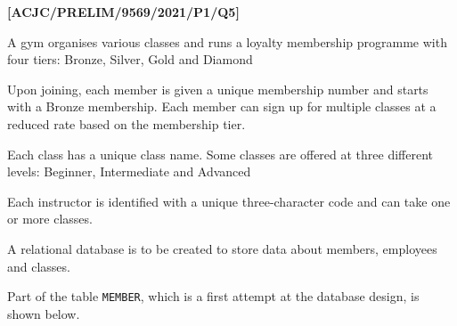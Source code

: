 \item \textbf{{[}ACJC/PRELIM/9569/2021/P1/Q5{]} }

A gym organises various classes and runs a loyalty membership programme
with four tiers: Bronze, Silver, Gold and Diamond 

Upon joining, each member is given a unique membership number and
starts with a Bronze membership. Each member can sign up for multiple
classes at a reduced rate based on the membership tier.

Each class has a unique class name. Some classes are offered at three
different levels: Beginner, Intermediate and Advanced

Each instructor is identified with a unique three-character code and
can take one or more classes.

A relational database is to be created to store data about members,
employees and classes.

Part of the table \texttt{MEMBER}, which is a first attempt at the
database design, is shown below. 

